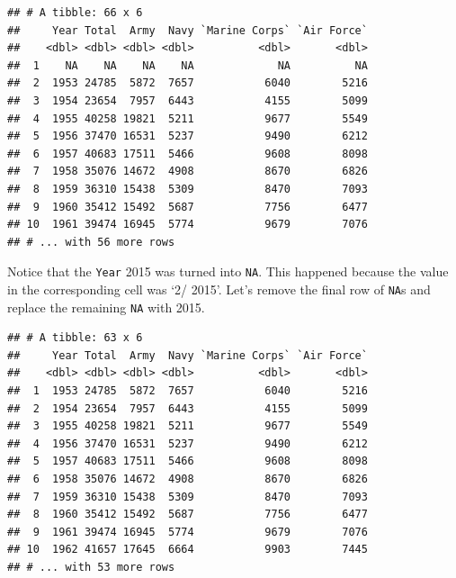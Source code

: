 \documentclass[]{book}
\newenvironment{Shaded}{\begin{snugshade}}{\end{snugshade}}
\newcommand{\KeywordTok}[1]{\textcolor[rgb]{0.13,0.29,0.53}{\textbf{{#1}}}}
\newcommand{\DecValTok}[1]{\textcolor[rgb]{0.00,0.00,0.81}{{#1}}}
\newcommand{\StringTok}[1]{\textcolor[rgb]{0.31,0.60,0.02}{{#1}}}
\newcommand{\NormalTok}[1]{{#1}}
\theoremstyle{definition}
\theoremstyle{definition}
\theoremstyle{remark}
\begin{document}
\begin{verbatim}
## # A tibble: 66 x 6
##     Year Total  Army  Navy `Marine Corps` `Air Force`
##    <dbl> <dbl> <dbl> <dbl>          <dbl>       <dbl>
##  1    NA    NA    NA    NA             NA          NA
##  2  1953 24785  5872  7657           6040        5216
##  3  1954 23654  7957  6443           4155        5099
##  4  1955 40258 19821  5211           9677        5549
##  5  1956 37470 16531  5237           9490        6212
##  6  1957 40683 17511  5466           9608        8098
##  7  1958 35076 14672  4908           8670        6826
##  8  1959 36310 15438  5309           8470        7093
##  9  1960 35412 15492  5687           7756        6477
## 10  1961 39474 16945  5774           9679        7076
## # ... with 56 more rows
\end{verbatim}

Notice that the \texttt{Year} 2015 was turned into \texttt{NA}. This
happened because the value in the corresponding cell was `2/ 2015'.
Let's remove the final row of \texttt{NA}s and replace the remaining
\texttt{NA} with 2015.

\begin{Shaded}
\end{Shaded}

\begin{verbatim}
## # A tibble: 63 x 6
##     Year Total  Army  Navy `Marine Corps` `Air Force`
##    <dbl> <dbl> <dbl> <dbl>          <dbl>       <dbl>
##  1  1953 24785  5872  7657           6040        5216
##  2  1954 23654  7957  6443           4155        5099
##  3  1955 40258 19821  5211           9677        5549
##  4  1956 37470 16531  5237           9490        6212
##  5  1957 40683 17511  5466           9608        8098
##  6  1958 35076 14672  4908           8670        6826
##  7  1959 36310 15438  5309           8470        7093
##  8  1960 35412 15492  5687           7756        6477
##  9  1961 39474 16945  5774           9679        7076
## 10  1962 41657 17645  6664           9903        7445
## # ... with 53 more rows
\end{verbatim}
\end{document}
